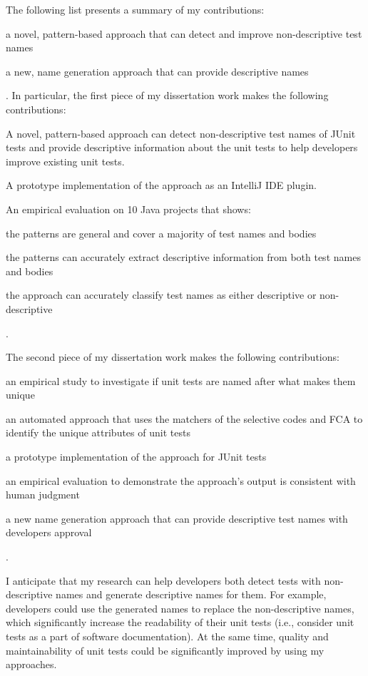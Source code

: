 The following list presents a summary of my contributions:
\begin{enumerate*}[label=(\roman*)]
    \item a novel, pattern-based approach that can detect and improve non-descriptive test names
    \item a new, name generation approach that can provide descriptive names
\end{enumerate*}.
%
In particular, the first piece of my dissertation work makes the following contributions:
\begin{enumerate*}
  \item A novel, pattern-based approach can detect non-descriptive test names of JUnit tests and provide descriptive information about the unit tests to help developers improve existing unit tests.
  \item A prototype implementation of the approach as an IntelliJ IDE plugin.
  \item An empirical evaluation on \num{10} Java projects that shows:
      \begin{enumerate*}[label=(\alph*)]
          \item the patterns are general and cover a majority of test names and bodies
          \item the patterns can accurately extract descriptive information from both test names and bodies
          \item the approach can accurately classify test names as either descriptive or non-descriptive
      \end{enumerate*}.
\end{enumerate*}
%
The second piece of my dissertation work makes the following contributions:
%
\begin{enumerate*}
    \item an empirical study to investigate if unit tests are named after what makes them unique
    \item an automated approach that uses the matchers of the selective codes and FCA to identify the unique attributes of unit tests
    \item a prototype implementation of the approach for JUnit tests
    \item an empirical evaluation to demonstrate the approach's output is consistent with human judgment
    \item a new name generation approach that can provide descriptive test names with developers approval
\end{enumerate*}.


I anticipate that my research can help developers both detect tests with non-descriptive names and generate descriptive names for them.
%
For example, developers could use the generated names to replace the non-descriptive names, which significantly increase the readability of their unit tests (i.e., consider unit tests as a part of software documentation).
%
At the same time, quality and maintainability of unit tests could be significantly improved by using my approaches.